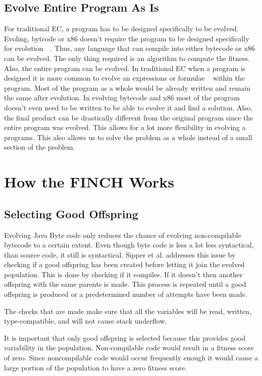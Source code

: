 \documentclass{sig-alternate}
\begin{document}
\subsection{Evolve Entire Program As Is}
For traditional EC, a program has to be designed specifically to be evolved. Evoling, bytcode or x86 doesn't require the program to be designed specifically for evolution~\cite{Assembly:2010}~\cite{FINCH:2011}. Thus, any language that can compile into either bytecode or x86 can be evolved. The only thing required is an algorithm to compute the fitness. Also, the entire program can be evolved. In traditional EC when a program is designed it is more common to evolve an expressions or formulae ~\cite{FINCH:2011} within the program. Most of the program as a whole would be already written and remain the same after evolution. In evolving bytecode and x86 most of the program doesn't even need to be written to be able to evolve it and find a solution. Also, the final product can be drastically different from the original program since the entire program was evolved. This allows for a lot more flexibility in evolving a programs. This also allows us to solve the problem as a whole instead of a small section of the problem.


\section{How the FINCH Works}

\subsection{Selecting Good Offspring}
Evolving Java Byte code only reduces the chance of evolving non-compilable bytecode to a certain extent. Even though byte code is less a lot less syntactical, than source code, it still is syntactical. Sipper et al.\cite{FINCH2:2009} addresses this issue by checking if a good offspring has been created before letting it join the evolved population. This is done by checking if it compiles. If it doesn't then another offspring with the same parents is made. This process is repeated until a good offspring is produced or a predetermined number of attempts have been made.\par
The checks that are made make sure that all the variables will be read, written, type-compatible, and will not cause stack underflow\cite{VIII:2011}.\par
It is important that only good offspring is selected because this provides good variability in the population. Non-compilable code would result in a fitness score of zero. Since noncompilable code would occur frequently enough it would cause a large portion of the population to have a zero fitness score.
\end{document}
